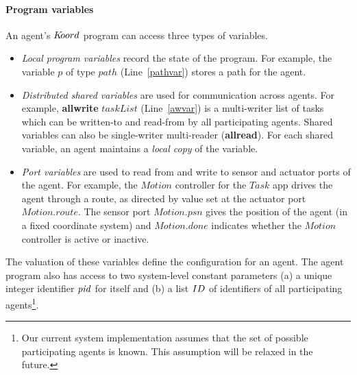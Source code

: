 \paragraph{Program variables}
An agent's $K\kern-2pt oord$ program can access three types of variables. 
%
\begin{itemize}
	\item {\em Local program variables\/} record the state of the program. For example, the variable $p$ of type $\mathit{path}$ (Line~\ref{pathvar}) stores a path for the agent. 
\item {\em Distributed shared variables\/} are used for communication across agents.  For example, {\bf allwrite} $\mathit{taskList}$ (Line~\ref{awvar}) is a multi-writer list of tasks which can be written-to and read-from by all participating agents. Shared variables can also be single-writer multi-reader ({\bf allread}). For each shared variable, an agent maintains a {\em local copy\/}  of the variable. 

\item {\em Port variables\/} are used to read from and write to sensor and actuator ports of the agent. For example, the $\mathit{Motion}$ controller for the $\mathit{Task}$ app  drives the agent  through a route, as directed by value set at the actuator port $\mathit{Motion.route}$. The sensor port $\mathit{Motion.psn}$ gives the position of the agent (in a fixed coordinate system) and $\mathit{Motion.done}$ indicates  whether the $\mathit{Motion}$ controller is active or inactive.
\end{itemize}
The valuation of these variables define the configuration for an agent. 
The agent program also has access to two system-level constant parameters (a) a unique integer identifier $\mathit{pid}$ for itself and (b) a list $ID$ of identifiers of all participating agents\footnote{Our current system implementation assumes that the set of possible participating agents is known. This assumption will be relaxed in the future.}. 


